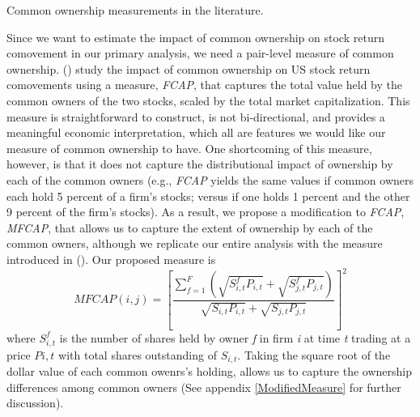 	{\begin{table}[htbp]
			\centering
			\scriptsize
			\caption{ Common ownership measurements in the literature.}
			\label{maasurmentsSummary}
			\resizebox{\textwidth}{!}{
				
			}
		\end{table}
	}
	
Since we want to estimate the impact of common ownership on stock return comovement in our primary analysis, we need a pair-level measure of common ownership. (\cite{AntonPolk}) study the impact of common ownership on US stock return comovements using a measure, \textit{FCAP}, that captures the total value held by the common owners of the two stocks, scaled by the total market capitalization. This measure is straightforward to construct, is not bi-directional, and provides a meaningful economic interpretation, which all are features we would like our measure of common ownership to have. One shortcoming of this measure, however, is that it does not capture the distributional impact of ownership by each of the common owners (e.g., \textit{FCAP} yields the same values if common owners each hold 5 percent of a firm's stocks; versus if one holds 1 percent and the other 9 percent of the firm's stocks). As a result, we propose a modification to \textit{FCAP}, \textit{MFCAP}, that allows us to capture the extent of ownership by each of the common owners, although we replicate our entire analysis with the measure introduced in (\cite{AntonPolk}). Our proposed measure is
\begin{equation}
	MFCAP(i, j) =  [\frac{\sum_{f =1}^{F}(\sqrt{S^f_{i,t}P_{i,t}}+\sqrt{S^f_{j,t}P_{j,t}})}{\sqrt{S_{i,t}P_{i,t}} + \sqrt{S_{j,t}P_{j,t}}}]^2 
	\label{sqrt}
\end{equation}
where $ S^f_{i,t}$ is the number of shares held by owner \textit{f} in firm \textit{i} at time \textit{t} trading at a price $ P{i,t} $ with total shares outstanding of $ S_{i,t} $. Taking the square root of the dollar value of each common owenrs's holding, allows us to capture the ownership differences among common owners ({See appendix \ref{ModifiedMeasure}} for further discussion). 


